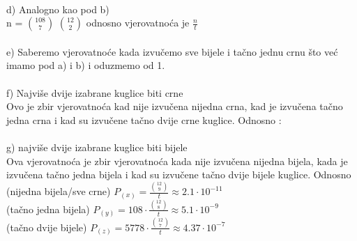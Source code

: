 \documentclass[12pt]{article}
\begin{document}
\begin{enumerate}
\begin{center}
{		\vspace{0.15cm}
		 \\ 
		\vspace{0.25cm}
		d) Analogno kao pod b) \\ 
			n = $108 \choose 7$ $12\choose2$ odnosno vjerovatnoća je $\frac{n}{t}$ \\
			\vspace{0.15cm}
			 \\ \vspace{0.15cm}
		e)  Saberemo vjerovatnoće kada izvučemo sve bijele i tačno jednu crnu što
            već imamo pod a) i b) i oduzmemo od 1. \\ \vspace{0.15cm}
             \\ \vspace{0.25cm}
        f) Najviše dvije izabrane kuglice biti crne \\ \vspace{0.15cm}
        Ovo je zbir vjerovatnoća kad nije izvučena nijedna crna, kad je izvučena tačno jedna crna i kad su izvučene tačno dvije crne kuglice. Odnosno : \\ \vspace{0.15cm}
         \\ \vspace{0.25cm}
        g) najviše dvije izabrane kuglice biti bijele \\ \vspace{0.15cm}
        Ova vjerovatnoća je zbir vjerovatnoća kada nije izvučena nijedna bijela, kada je izvučena tačno jedna bijela i kad su izvučene tačno dvije bijele kuglice. Odnosno \\
        \vspace{0.15cm}
        (nijedna bijela/sve crne) $P_{(x)} = \frac{{12\choose9}}{t} \approx 2.1\cdot 10^{-11} $ \\ \vspace{0.15cm}
        (tačno jedna bijela) $P_{(y)} = 108\cdot \frac{{12\choose8}}{t} \approx 5.1\cdot 10^{-9} $
        \\ \vspace{0.15cm}
        (tačno dvije bijele) $P_{(z)} = 5778\cdot \frac{{12\choose7}}{t} \approx 4.37\cdot 10^{-7} $
        \\ \vspace{0.25cm}
}
\end{center}
\end{enumerate}
\end{document}
